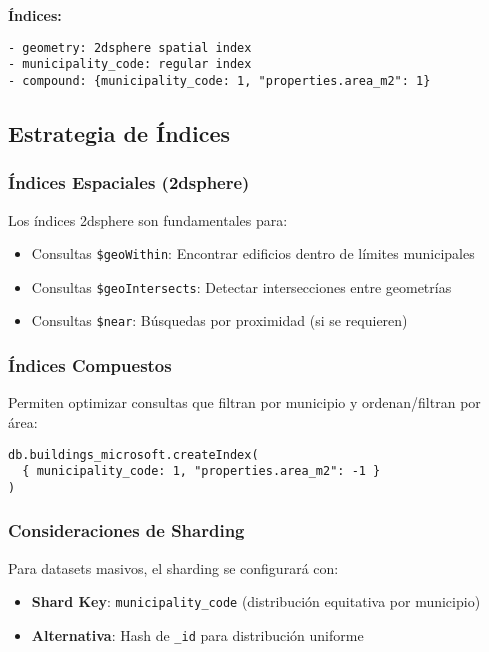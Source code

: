\documentclass[12pt,a4paper]{article}
\begin{document}
\textbf{Índices:}
\begin{verbatim}
- geometry: 2dsphere spatial index
- municipality_code: regular index
- compound: {municipality_code: 1, "properties.area_m2": 1}
\end{verbatim}

\subsection{Estrategia de Índices}

\subsubsection{Índices Espaciales (2dsphere)}

Los índices 2dsphere son fundamentales para:
\begin{itemize}
    \item Consultas \texttt{\$geoWithin}: Encontrar edificios dentro de límites municipales
    \item Consultas \texttt{\$geoIntersects}: Detectar intersecciones entre geometrías
    \item Consultas \texttt{\$near}: Búsquedas por proximidad (si se requieren)
\end{itemize}

\subsubsection{Índices Compuestos}

Permiten optimizar consultas que filtran por municipio y ordenan/filtran por área:
\begin{verbatim}
db.buildings_microsoft.createIndex(
  { municipality_code: 1, "properties.area_m2": -1 }
)
\end{verbatim}

\subsubsection{Consideraciones de Sharding}

Para datasets masivos, el sharding se configurará con:
\begin{itemize}
    \item \textbf{Shard Key}: \texttt{municipality\_code} (distribución equitativa por municipio)
    \item \textbf{Alternativa}: Hash de \texttt{\_id} para distribución uniforme
\end{itemize}
\end{document}
